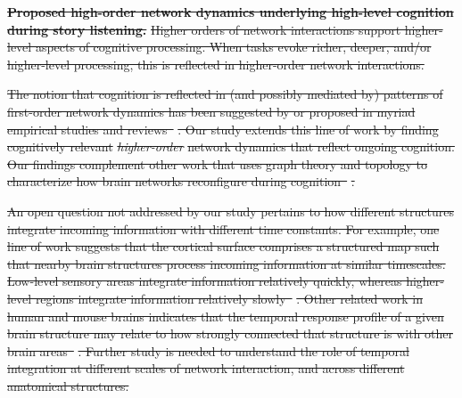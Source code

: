 \documentclass[english]{article}
\providecommand{\DIFdeltex}[1]{{\protect\color{red}\sout{#1}}}                      %
\providecommand{\DIFdelFL}[1]{\DIFdel{#1}} %
\providecommand{\DIFdel}[1]{\texorpdfstring{\DIFdeltex{#1}}{}} %
\begin{document}
{%
\textbf{\DIFdelFL{Proposed high-order network dynamics underlying
      high-level cognition during story listening.}}  %
\DIFdelFL{Higher orders of
    network interactions support higher-level aspects of cognitive
    processing.  When tasks evoke richer, deeper, and/or higher-level
    processing, this is reflected in higher-order network
    interactions.}}

\DIFdel{The notion that cognition is reflected in (and possibly mediated by)
patterns of first-order network dynamics has been suggested by or
proposed in myriad empirical studies and
reviews~}%
\DIFdel{.  Our study extends this line of work by
finding cognitively relevant }\textit{\DIFdel{higher-order}} %
\DIFdel{network dynamics
that reflect ongoing cognition.  Our findings complement other work
that uses graph theory and topology to characterize how brain networks
reconfigure during cognition~}%
\DIFdel{.
}%

\DIFdel{An open question not addressed by our study pertains to how different
structures integrate incoming information with different time
constants.  For example, one line of work suggests that the cortical
surface comprises a structured map such that nearby brain structures
process incoming information at similar timescales.  Low-level sensory
areas integrate information relatively quickly, whereas higher-level
regions integrate information relatively slowly~}%
\DIFdel{.  Other
related work in human and mouse brains indicates that the temporal
response profile of a given brain structure may relate to how strongly
connected that structure is with other brain
areas~}%
\DIFdel{.  Further study is needed to understand the
role of temporal integration at different scales of network
interaction, and across different anatomical structures.
}%
\end{document}
